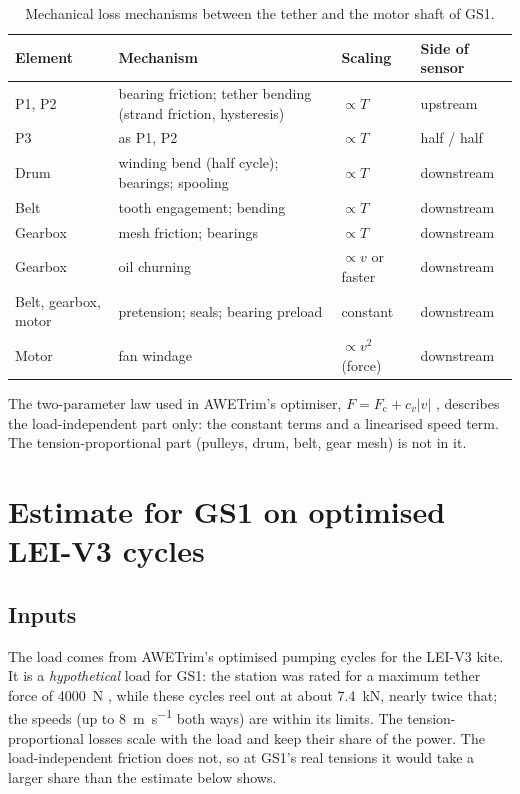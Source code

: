 \documentclass[11pt,a4paper]{article}
\begin{document}
\begin{table}[H]
\centering\small
\caption{Mechanical loss mechanisms between the tether and the motor shaft of
GS1.}
\label{tab:mechanisms}
\begin{tabularx}{\textwidth}{lXll}
\toprule
Element & Mechanism & Scaling & Side of sensor \\
\midrule
P1, P2 & bearing friction; tether bending (strand friction, hysteresis) & $\propto T$ & upstream \\
P3 & as P1, P2 & $\propto T$ & half / half \\
Drum & winding bend (half cycle); bearings; spooling & $\propto T$ & downstream \\
Belt & tooth engagement; bending & $\propto T$ & downstream \\
Gearbox & mesh friction; bearings & $\propto T$ & downstream \\
Gearbox & oil churning & $\propto v$ or faster & downstream \\
Belt, gearbox, motor & pretension; seals; bearing preload & constant & downstream \\
Motor & fan windage & $\propto v^2$ (force) & downstream \\
\bottomrule
\end{tabularx}
\end{table}

The two-parameter law used in AWETrim's optimiser,
$F = F_\mathrm{c} + c_v |v|$ \cite{fechner2016}, describes the
load-independent part only: the constant terms and a linearised speed term.
The tension-proportional part (pulleys, drum, belt, gear mesh) is not in it.

\section{Estimate for GS1 on optimised LEI-V3 cycles}
\label{sec:est}

\subsection{Inputs}
The load comes from AWETrim's optimised pumping cycles for the LEI-V3 kite. It
is a \emph{hypothetical} load for GS1: the station was rated for a maximum
tether force of \SI{4000}{N} \cite[Table~3.1]{fechner2016}, while these cycles
reel out at about \SI{7.4}{kN}, nearly twice that; the speeds (up to
\SI{8}{m.s^{-1}} both ways) are within its limits. The tension-proportional
losses scale with the load and keep their share of the power. The
load-independent friction does not, so at GS1's real tensions it would take a
larger share than the estimate below shows.
\end{document}
